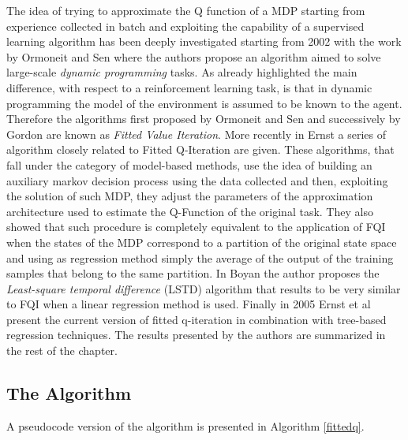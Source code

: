 	\noindent The idea of trying to approximate the Q function of a MDP starting from experience collected in batch and exploiting
	the capability of a supervised learning algorithm has been deeply investigated starting from 2002 with the work by Ormoneit and Sen \cite{ormoneit2002kernel}
	where the authors propose an algorithm aimed to solve large-scale \textit{dynamic programming} tasks. As already highlighted the main difference,
	with respect to a reinforcement learning task, is that in dynamic programming the model of the environment is assumed to be known to the agent.
	Therefore the algorithms first proposed by Ormoneit and Sen and successively by Gordon \cite{gordon1999approximate} are known as \textit{Fitted Value Iteration}.\newline
	More recently in Ernst \cite{ernst2003near} a series of algorithm closely related to Fitted Q-Iteration are given.
	These algorithms, that fall under the category of model-based methods, use the idea of building an auxiliary
	markov decision process using the data collected and then, exploiting the solution of such MDP, they adjust the
	parameters of the approximation architecture used to estimate the Q-Function of the original task. They also showed
	that such procedure is completely equivalent to the application of FQI when the states of the MDP correspond to a
	partition of the original state space and using as regression method simply the average of the output of the training samples
	that belong to the same partition.\newline
	In Boyan \cite{boyan2002technical} the author proposes the \textit{Least-square temporal difference} (LSTD) algorithm that results
	to be very similar to FQI when a linear regression method is used.\newline
	Finally in 2005 Ernst et al \cite{ernst2005tree} present the current version of fitted q-iteration in combination with tree-based
	regression techniques. The results presented by the authors are summarized in the rest of the chapter.

	\subsection{The Algorithm}

		\noindent A pseudocode version of the algorithm is presented in Algorithm \ref{fittedq}.\newline

